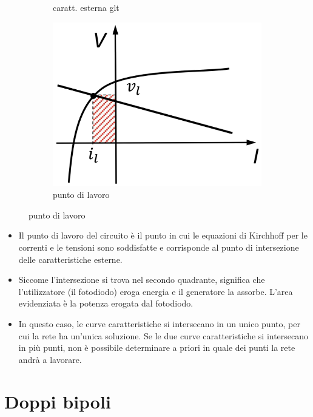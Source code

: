 \documentclass[a4paper]{article}
\begin{document}
\begin{figure}[h]
\begin{minipage}{0.2\textwidth}
\begin{subfigure}[h]{0.8\textwidth}
			\caption*{caratt. esterna glt}
		\end{subfigure}
	\end{minipage}
	\begin{minipage}{0.2\textwidth}
		\begin{subfigure}[h]{0.9\textwidth}
			\includegraphics[width=\textwidth]{puntodilavoro.png}
			\caption*{punto di lavoro}
		\end{subfigure}
	\end{minipage}
\end{figure}
\begin{itemize}
	\item Il punto di lavoro del circuito è il punto in cui le equazioni di Kirchhoff per le correnti e le tensioni sono
	soddisfatte e corrisponde al punto di intersezione delle caratteristiche esterne.
	\item Siccome l'intersezione si trova nel secondo quadrante, significa che l'utilizzatore (il fotodiodo) eroga energia
	e il generatore la assorbe. L'area evidenziata è la potenza erogata dal fotodiodo.
	\item In questo caso, le curve caratteristiche si intersecano in un unico punto, per cui la rete ha un'unica soluzione.
	Se le due curve caratteristiche si intersecano in più punti, non è possibile determinare a priori in quale dei punti
	la rete andrà a lavorare.
\end{itemize}

\newpage

\section{Doppi bipoli}
\end{document}
